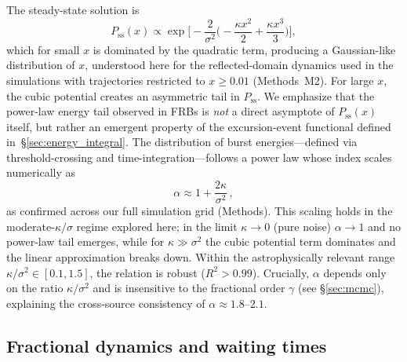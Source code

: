 \documentclass[twocolumn]{article}
\begin{document}
The steady-state solution is
\begin{equation}
P_{\mathrm{ss}}(x) \propto \exp\!\Biggl[-\frac{2}{\sigma^2}\biggl(-\frac{\kappa x^2}{2} + \frac{\kappa x^3}{3}\biggr)\Biggr],
\label{eq:steady}
\end{equation}
which for small $x$ is dominated by the quadratic term, producing a Gaussian-like distribution of $x$, understood here for the reflected-domain dynamics used in the simulations with trajectories restricted to $x \ge 0.01$ (Methods~M2). For large $x$, the cubic potential creates an asymmetric tail in $P_{\mathrm{ss}}$. We emphasize that the power-law energy tail observed in FRBs is \emph{not} a direct asymptote of $P_{\mathrm{ss}}(x)$ itself, but rather an emergent property of the excursion-event functional defined in~\S\ref{sec:energy_integral}. The distribution of burst energies---defined via threshold-crossing and time-integration---follows a power law whose index scales numerically as
\begin{equation}
\alpha \approx 1 + \frac{2\kappa}{\sigma^2}\,,
\label{eq:alpha}
\end{equation}
as confirmed across our full simulation grid (Methods). This scaling holds in the moderate-$\kappa/\sigma$ regime explored here; in the limit $\kappa \to 0$ (pure noise) $\alpha \to 1$ and no power-law tail emerges, while for $\kappa \gg \sigma^2$ the cubic potential term dominates and the linear approximation breaks down. Within the astrophysically relevant range $\kappa/\sigma^2 \in [0.1, 1.5]$, the relation is robust ($R^2 > 0.99$). Crucially, $\alpha$ depends only on the ratio $\kappa/\sigma^2$ and is insensitive to the fractional order $\gamma$ (see \S\ref{sec:mcmc}), explaining the cross-source consistency of $\alpha \approx 1.8$--$2.1$.


\subsection{Fractional dynamics and waiting times}
\end{document}
